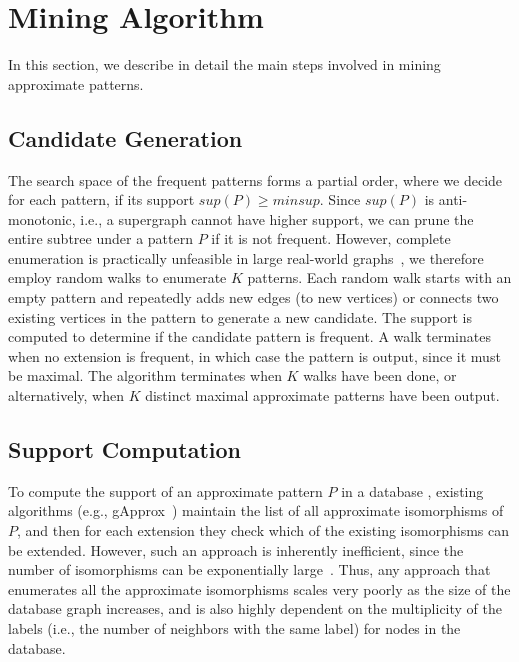 \section{Mining Algorithm}

In this section, we describe in detail the main steps involved in
mining approximate patterns. 

\subsection{Candidate Generation} 

The search space of the frequent patterns forms a partial order, where
we decide for each pattern, if its support $sup(P) \geq minsup$. Since
$sup(P)$ is anti-monotonic, i.e., a supergraph cannot have higher support,
we can prune the entire subtree under a pattern $P$ if it is not
frequent.  However, complete enumeration is practically unfeasible in large
real-world graphs~\cite{2008-origami:sadm,2009-graphsampling}, we
therefore employ
random walks \cite{2011-icdm} to enumerate $K$ patterns.  Each
random walk starts with an empty pattern and repeatedly adds new edges
(to new vertices) or connects two existing vertices in the pattern to
generate a new candidate.  The support is computed to determine if the
candidate pattern is frequent. A walk terminates when no extension is
frequent, in which case the pattern is output, since it must be
maximal. The algorithm terminates when $K$ walks have been done, or
alternatively, when $K$ distinct maximal approximate
patterns have been output. 

\subsection{Support Computation}
To compute the support of an approximate pattern $P$ in a database \db,
existing algorithms (e.g., gApprox~\cite{gapprox}) maintain the list of
all approximate isomorphisms of $P$, and then for each extension they
check which of the existing isomorphisms can be extended. However, such an
approach is inherently inefficient, since the number of isomorphisms can
be exponentially large~\cite{2011-icdm}.  Thus, any approach that
enumerates all the approximate isomorphisms scales very poorly as the size
of the database graph increases, and is also highly dependent on the
multiplicity of the labels (i.e., the number of neighbors with the same
label) for nodes in the database.

